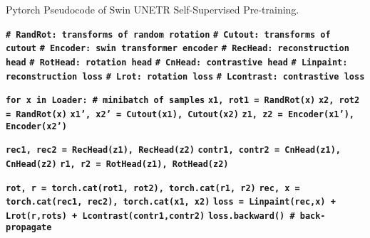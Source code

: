 \documentclass[10pt,twocolumn,letterpaper]{article}
\begin{document}
\begin{algorithm*}[t!]
\caption{Pytorch Pseudocode of Swin UNETR Self-Supervised Pre-training.}\label{alg:only_one}
  \begin{algorithmic}
\small \State \texttt{\textbf{{\color{blue}\# RandRot: transforms of random rotation}}}
\State \texttt{\textbf{\color{blue}\# Cutout: transforms of cutout}}
\State \texttt{\textbf{\color{blue}\# Encoder: swin transformer encoder}}
\State \texttt{\textbf{\color{blue}\# RecHead: reconstruction head}}
\State \texttt{\textbf{\color{blue}\# RotHead: rotation head}}
\State \texttt{\textbf{\color{blue}\# CnHead: contrastive head}}
\State \texttt{\textbf{\color{blue}\# Linpaint: reconstruction loss}}
\State \texttt{\textbf{\color{blue}\# Lrot: rotation loss}}
\State \texttt{\textbf{\color{blue}\# Lcontrast: contrastive loss}}

\State \texttt{\textbf{for x in Loader: {\color{blue}\# minibatch of samples}}}
    \State \hspace{0.4cm} \texttt{\textbf{x1, rot1 = RandRot(x)}}
    \State \hspace{0.4cm} \texttt{\textbf{x2, rot2 = RandRot(x)}}
    \State \hspace{0.4cm} \texttt{\textbf{x1', x2' = Cutout(x1), Cutout(x2)}}
\State \hspace{0.4cm} \texttt{\textbf{z1, z2 = Encoder(x1'), Encoder(x2')}}


    \State \hspace{0.4cm} \texttt{\textbf{rec1, rec2 = RecHead(z1), RecHead(z2)}}
    \State \hspace{0.4cm} \texttt{\textbf{contr1, contr2 = CnHead(z1), CnHead(z2)}}
    \State \hspace{0.4cm} \texttt{\textbf{r1, r2 = RotHead(z1), RotHead(z2)}}

    \State \hspace{0.4cm} \texttt{\textbf{rot, r = torch.cat(rot1, rot2), torch.cat(r1, r2)}}
    \State \hspace{0.4cm} \texttt{\textbf{rec, x = torch.cat(rec1, rec2), torch.cat(x1, x2)}}
    \State \hspace{0.4cm} \texttt{\textbf{loss = Linpaint(rec,x) + Lrot(r,rots) + Lcontrast(contr1,contr2)}}
    \State \hspace{0.4cm} \texttt{\textbf{loss.backward() {\color{blue}\# back-propagate}}} \\






\end{algorithmic}
\end{algorithm*}
\end{document}
